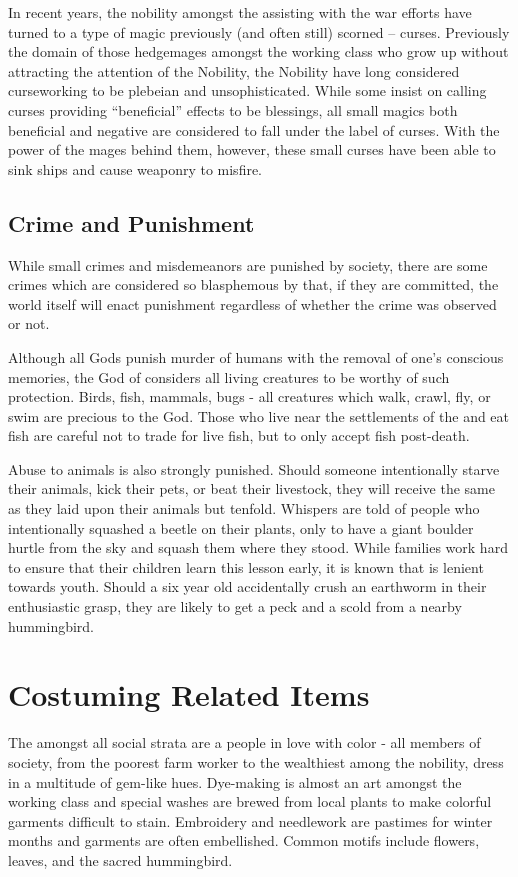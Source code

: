 \documentclass[blue]{GL2020}
\begin{document}
In recent years, the nobility amongst the \pFarm{} assisting with the war efforts have turned to a type of magic previously (and often still) scorned -- curses.  Previously the domain of those hedgemages amongst the working class who grow up without attracting the attention of the Nobility, the Nobility have long considered curseworking to be plebeian and unsophisticated.  While some insist on calling curses providing “beneficial” effects to be blessings, all small magics both beneficial and negative are considered to fall under the label of curses.  With the power of the \pFarm{} mages behind them, however, these small curses have been able to sink ships and cause \pShip{} weaponry to misfire.

\subsection*{Crime and Punishment}

While small crimes and misdemeanors are punished by society, there are some crimes which are considered so blasphemous by \cFarmGod{} that, if they are committed, the world itself will enact punishment regardless of whether the crime was observed or not.

Although all Gods punish murder of humans with the removal of one's conscious memories, the God of \pFarm{} considers all living creatures to be worthy of such protection.  Birds, fish, mammals, bugs - all creatures which walk, crawl, fly, or swim are precious to the God.  Those \pFarm{} who live near the settlements of the \pShip{} and eat fish are careful not to trade for live fish, but to only accept fish post-death.

Abuse to animals is also strongly punished.  Should someone intentionally starve their animals, kick their pets, or beat their livestock, they will receive the same as they laid upon their animals but tenfold.  Whispers are told of people who intentionally squashed a beetle on their plants, only to have a giant boulder hurtle from the sky and squash them where they stood.  While families work hard to ensure that their children learn this lesson early, it is known that \cFarmGod{} is lenient towards youth.  Should a six year old accidentally crush an earthworm in their enthusiastic grasp, they are likely to get a peck and a scold from a nearby hummingbird. 

\section*{Costuming Related Items}

The \pFarm{} amongst all social strata are a people in love with color - all members of society, from the poorest farm worker to the wealthiest among the nobility, dress in a multitude of gem-like hues.  Dye-making is almost an art amongst the working class and special washes are brewed from local plants to make colorful garments difficult to stain.  Embroidery and needlework are pastimes for winter months and garments are often embellished.  Common motifs include flowers, leaves, and the sacred hummingbird.
\end{document}
